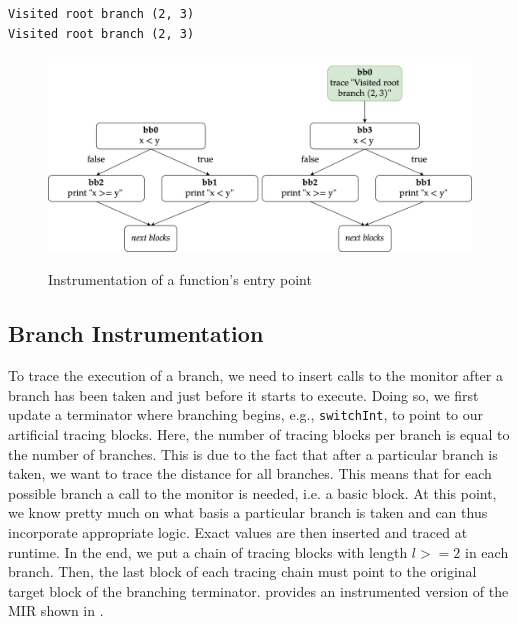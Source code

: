 \documentclass[paper=a4,%
  twoside,%
  BCOR4mm,%
  abstract=true,%
  toc=bibliography,%
  chapterprefix=true,%
  toc=bibliographynumbered,%
  open=right,%
  english,%
  pagesize=pdftex]{scrreprt}
\newcommand{\mir}{\ac{MIR}\xspace}
\begin{document}
\begin{lstlisting}[language={}, style=boxed, caption={}]
Visited root branch (2, 3)
Visited root branch (2, 3)
\end{lstlisting}

\begin{figure}[h]
\caption{Instrumentation of a function's entry point}
\centering
\includegraphics[width=\textwidth]{comparison-instrumented-fn-entry}
\label{fig:comparison-instrumented-fn-entry}
\end{figure}

\subsection{Branch Instrumentation}
To trace the execution of a branch, we need to insert calls to the monitor after a branch has been taken and just before it starts to execute. Doing so, we first update a terminator where branching begins, e.g., \texttt{switchInt}, to point to our artificial tracing blocks. Here, the number of tracing blocks per branch is equal to the number of branches. This is due to the fact that after a particular branch is taken, we want to trace the distance for all branches. This means that for each possible branch a call to the monitor is needed, i.e. a basic block. At this point, we know pretty much on what basis a particular branch is taken and can thus incorporate appropriate logic. Exact values are then inserted and traced at runtime. In the end, we put a chain of tracing blocks with length $l >= 2$ in each branch. Then, the last block of each tracing chain must point to the original target block of the branching terminator.  provides an instrumented version of the \mir shown in .
\end{document}
